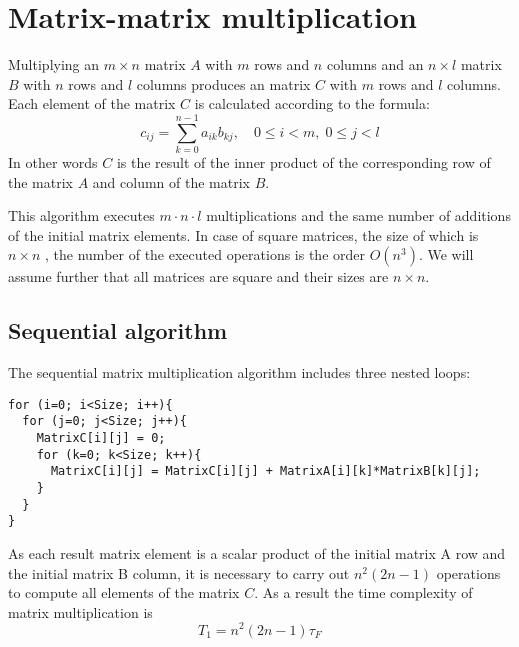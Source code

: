 
\section{Matrix-matrix multiplication} %
\label{sec:matrix_matrix_multiplication}

Multiplying an $m\times n$ matrix $A$ with $m$ rows and $n$ columns and an $n\times l$ matrix $B$ with $n$ rows and $l$ columns produces an matrix $C$ with $m$ rows and $l$ columns. Each element of the matrix $C$ is calculated according to the formula:
\begin{equation}
  c_{ij} = \sum_{k=0}^{n-1} a_{ik} b_{kj}, \quad 0 \leq i < m, \; 0\leq j < l
\end{equation}
In other words $C$ is the result of the inner product of the corresponding row of the matrix $A$ and column of the matrix $B$.

This algorithm executes $m\cdot n\cdot l$ multiplications and the same number of additions of the initial matrix elements. In case of square matrices, the size of which is $n\times n$ , the number of the executed operations is the order $O(n^3)$.  We will assume further that all matrices are square and their sizes are $n\times n$.

\subsection{Sequential algorithm} %
\label{sub:sequential_algorithm}
The sequential matrix multiplication algorithm includes three nested loops:

\begin{lstlisting}
for (i=0; i<Size; i++){
  for (j=0; j<Size; j++){
    MatrixC[i][j] = 0;
    for (k=0; k<Size; k++){
      MatrixC[i][j] = MatrixC[i][j] + MatrixA[i][k]*MatrixB[k][j];
    }
  }
}
\end{lstlisting}

As each result matrix element is a scalar product of the initial matrix A row and the initial matrix B column, it
is necessary to carry out $n^2(2n-1)$ operations to compute all elements of the matrix $C$. As a result the time complexity of matrix multiplication is
\begin{equation}
  T_1 = n^2(2n-1)\tau_F
\end{equation}



